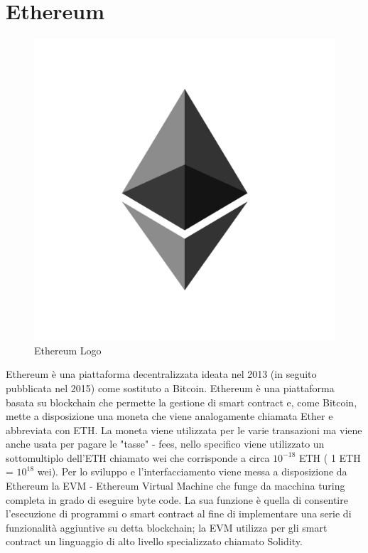 \documentclass[11pt,a4paper,titlepage, twoside, openright]{report}
\begin{document}
\section{Ethereum}

\begin{figure}[h]
	\includegraphics[height=0.2\textheight]{eth}
	\centering
	\caption{Ethereum Logo}
	\label{fig:eth-logo}
\end{figure}

Ethereum è una piattaforma decentralizzata ideata nel 2013 (in seguito pubblicata nel 2015) come sostituto a Bitcoin. Ethereum è una piattaforma basata su blockchain che permette la gestione di smart contract e, come Bitcoin, mette a disposizione una moneta che viene analogamente chiamata Ether e abbreviata con ETH. La moneta viene utilizzata per le varie transazioni ma viene anche usata per pagare le "tasse" - fees, nello specifico viene utilizzato un sottomultiplo dell'ETH chiamato wei che corrisponde a circa  $ 10^{-18} $ ETH  ( 1 ETH = $ 10^{18} $ wei). Per lo sviluppo e l'interfacciamento viene messa a disposizione da Ethereum la EVM - Ethereum Virtual Machine che funge da macchina turing completa in grado di eseguire byte code. La sua funzione è quella di consentire l'esecuzione di programmi o smart contract al fine di implementare una serie di funzionalità aggiuntive su detta blockchain; la EVM utilizza per gli smart contract un linguaggio di alto livello specializzato chiamato Solidity.
\end{document}
